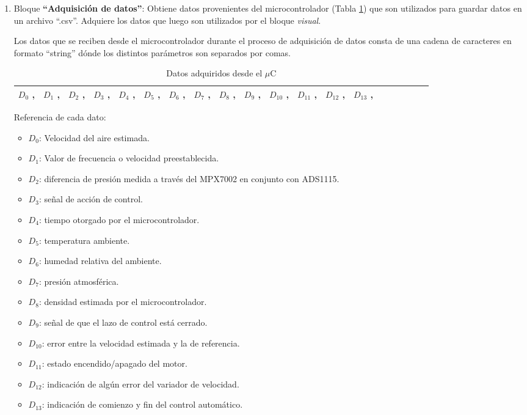 \begin{enumerate}
\item Bloque \textbf{“Adquisición de datos”}: 
\subitem Obtiene datos provenientes del microcontrolador (Tabla \ref{tab:Datosdesde}) que son utilizados para guardar datos en un archivo “.csv”. 
\subitem Adquiere los datos que luego son utilizados por el bloque \textit{visual}.
 
Los datos que se reciben desde el microcontrolador durante el proceso de adquisición de datos consta de una cadena de caracteres en formato “string” dónde los distintos parámetros son separados por comas.
\begin{table}[H]
	\centering
	\begin{tabular}{|l|l|l|l|l|l|l|l|l|l|l|l|l|l|l|l|l|l|l|l|}
		\hline
		$D_0$ , & $D_1$ , & $D_2$ , & $D_3$ , & $D_4$ , & $D_5$ , & $D_6$ ,  & $D_7$ , & $D_8$ , & $D_9$ , & $D_{10}$ , & $D_{11}$ , & $D_{12}$ , & $D_{13}$ ,  \\ \hline
	\end{tabular}
\caption{Datos adquiridos desde el $\mu$C}
\label{tab:Datosdesde}
\end{table}

Referencia de cada dato:
	\begin{itemize}
	\item $D_0$: Velocidad del aire estimada.
	\item 	$D_1$: Valor de frecuencia o velocidad preestablecida.
	\item 	$D_2$: diferencia de presión medida a través del MPX7002 en conjunto con ADS1115.
	\item 	$D_3$: señal de acción de control.
	\item 	$D_4$: tiempo otorgado por el microcontrolador.
	\item 	$D_5$: temperatura ambiente.
	\item 	$D_6$: humedad relativa del ambiente.
	\item 	$D_7$: presión atmosférica.
	\item 	$D_8$: densidad estimada por el microcontrolador.
	\item 	$D_9$: señal de que el lazo de control está cerrado.
	\item 	$D_{10}$: error entre la velocidad estimada y la de referencia.
	\item 	$D_{11}$: estado encendido/apagado del motor.
	\item 	$D_{12}$: indicación de algún error del variador de velocidad.
	\item 	$D_{13}$: indicación de comienzo y fin del control automático.
	\end{itemize}	



\end{enumerate}
